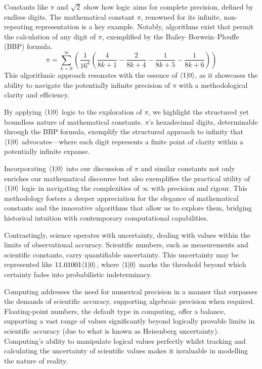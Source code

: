 \documentclass[12pt]{article}
\begin{document}
Constants like \(\pi\) and \(\sqrt{2}\) show how logic aims for complete precision, defined by endless digits. The mathematical constant \(\pi\), renowned for its infinite, non-repeating representation is a key example. Notably, algorithms exist that permit the calculation of any digit of \(\pi\), exemplified by the Bailey–Borwein–Plouffe (BBP) formula.
\[ \pi = \sum_{k=0}^{\infty} \left( \frac{1}{16^k} \left( \frac{4}{8k + 1} - \frac{2}{8k + 4} - \frac{1}{8k + 5} - \frac{1}{8k + 6} \right) \right) \]
This algorithmic approach resonates with the essence of \(\langle 1 | 0 \rangle\), as it showcases the ability to navigate the potentially infinite precision of \(\pi\) with a methodological clarity and efficiency.

By applying \(\langle 1 | 0 \rangle\) logic to the exploration of \(\pi\), we highlight the structured yet boundless nature of mathematical constants. \(\pi\)'s hexadecimal digits, determinable through the BBP formula, exemplify the structured approach to infinity that \(\langle 1 | 0 \rangle\) advocates—where each digit represents a finite point of clarity within a potentially infinite expanse.

Incorporating \(\langle 1 | 0 \rangle\) into our discussion of \(\pi\) and similar constants not only enriches our mathematical discourse but also exemplifies the practical utility of \(\langle 1 | 0 \rangle\) logic in navigating the complexities of \(\infty\) with precision and rigour. This methodology fosters a deeper appreciation for the elegance of mathematical constants and the innovative algorithms that allow us to explore them, bridging historical intuition with contemporary computational capabilities.

Contrastingly, science operates with uncertainty, dealing with values within the limits of observational accuracy. Scientific numbers, such as measurements and scientific constants, carry quantifiable uncertainty. This uncertainty may be represented like \(11.01001\langle 1 | 0 \rangle\), where \(\langle 1 | 0 \rangle\) marks the threshold beyond which certainty fades into probabilistic indeterminacy.

Computing addresses the need for numerical precision in a manner that surpasses the demands of scientific accuracy, supporting algebraic precision when required. Floating-point numbers, the default type in computing, offer a balance, supporting a vast range of values significantly beyond logically provable limits in scientific accuracy (due to what is known as Heisenberg uncertainty). Computing's ability to manipulate logical values perfectly whilst tracking and calculating the uncertainty of scientific values makes it invaluable in modelling the nature of reality.
\end{document}
